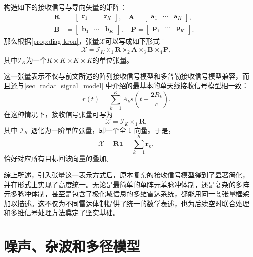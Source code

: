 构造如下的接收信号与导向矢量的矩阵：
\[
    \begin{split}
        \mathbf{R} & = \begin{bmatrix}
                           \bm{r}_1 & \cdots & \bm{r}_K
                       \end{bmatrix}, \quad
        \mathbf{A} = \begin{bmatrix}
                         \bm{a}_1 & \cdots & \bm{a}_K
                     \end{bmatrix}, \quad   \\
        \mathbf{B} & = \begin{bmatrix}
                           \bm{b}_1 & \cdots & \bm{b}_K
                       \end{bmatrix}, \quad
        \mathbf{P} = \begin{bmatrix}
                         \bm{p}_1 & \cdots & \bm{p}_K
                     \end{bmatrix}.
    \end{split}
\]
那么根据\cref{prop:diag-kron}，张量\( \mathcal{X} \)可以写成如下形式：
\[
    \begin{split}
        \mathcal{X} = \mathcal{I}_K \times_1 \mathbf{R} \times_2 \mathbf{A} \times_3 \mathbf{B} \times_4 \mathbf{P},
    \end{split}
\]
其中\( \mathcal{I}_K \)为一个\( K \times K \times K \times K \)的单位张量。

这一张量表示不仅与前文所述的阵列接收信号模型和多普勒接收信号模型兼容，而且还与\cref{sec_radar_signal_model} 中介绍的最基本的单天线接收信号模型相一致：
\[
    r(t) = \sum_{k=1}^{K} A_k s\!\left(t - \frac{2 R_k}{c}\right).
\]
在这种情况下，接收信号张量可写为
\[
    \mathcal{X} = \mathcal{I}_K \times_1 \mathbf{R},
\]
其中 \(\mathcal{I}_K\) 退化为一阶单位张量，即一个全 1 向量。于是，
\[
    \mathcal{X} = \mathbf{R}\bm{1} = \sum_{k=1}^{K} \bm{r}_k,
\]
恰好对应所有目标回波向量的叠加。

综上所述，引入张量这一表示方式后，原本复杂的接收信号模型得到了显著简化，并在形式上实现了高度统一。无论是最简单的单阵元单脉冲体制，还是复杂的多阵元多脉冲体制，甚至是包含了极化域信息的多维雷达系统，都能用同一套张量框架加以描述。这不仅为不同雷达体制提供了统一的数学表述，也为后续空时联合处理和多维信号处理方法奠定了坚实基础。

\section{噪声、杂波和多径模型}

